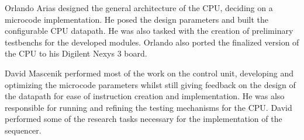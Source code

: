 \label{sec:contribs}
Orlando Arias designed the general architecture of the CPU, deciding on a
microcode implementation. He posed the design parameters and built the
configurable CPU datapath. He was also tasked with the creation of preliminary
testbenchs for the developed modules. Orlando also ported the finalized
version of the CPU to his Digilent Nexys 3 board.\par

David Mascenik performed most of the work on the control unit, developing and
optimizing the microcode parameters whilst still giving feedback on the design
of the datapath for ease of instruction creation and implementation. He was
also responsible for running and refining the testing mechanisms for the CPU.
David performed some of the research tasks necessary for the implementation of
the sequencer.\par
